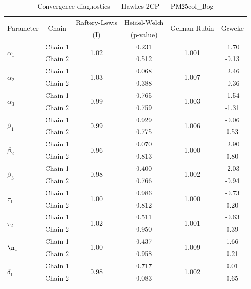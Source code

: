 \begin{table}[H]
\centering
\caption{Convergence diagnostics — Hawkes 2CP — PM25col_Bog}
\begin{tabular}{lccccc}
\toprule
\multirow{2}{*}{Parameter} & \multirow{2}{*}{Chain} & Raftery-Lewis & Heidel-Welch & \multirow{2}{*}{Gelman-Rubin} & \multirow{2}{*}{Geweke} \\
 & & (I) & (p-value) & & (z) \\
\midrule
\multirow{2}{*}{$\alpha_1$} & Chain 1 & \multirow{2}{*}{1.02} & 0.231 & \multirow{2}{*}{1.001} & -1.70 \\
 & Chain 2 & & 0.512 & & -0.13 \\
\multirow{2}{*}{$\alpha_2$} & Chain 1 & \multirow{2}{*}{1.03} & 0.068 & \multirow{2}{*}{1.007} & -2.46 \\
 & Chain 2 & & 0.388 & & -0.36 \\
\multirow{2}{*}{$\alpha_3$} & Chain 1 & \multirow{2}{*}{0.99} & 0.765 & \multirow{2}{*}{1.003} & -1.54 \\
 & Chain 2 & & 0.759 & & -1.31 \\
\midrule
\multirow{2}{*}{$\beta_1$} & Chain 1 & \multirow{2}{*}{0.99} & 0.929 & \multirow{2}{*}{1.006} & -0.06 \\
 & Chain 2 & & 0.775 & & 0.53 \\
\multirow{2}{*}{$\beta_2$} & Chain 1 & \multirow{2}{*}{0.96} & 0.070 & \multirow{2}{*}{1.000} & -2.90 \\
 & Chain 2 & & 0.813 & & 0.80 \\
\multirow{2}{*}{$\beta_3$} & Chain 1 & \multirow{2}{*}{0.98} & 0.400 & \multirow{2}{*}{1.002} & -2.03 \\
 & Chain 2 & & 0.766 & & -0.94 \\
\midrule
\multirow{2}{*}{$\tau_1$} & Chain 1 & \multirow{2}{*}{1.00} & 0.986 & \multirow{2}{*}{1.000} & -0.73 \\
 & Chain 2 & & 0.812 & & 0.20 \\
\multirow{2}{*}{$\tau_2$} & Chain 1 & \multirow{2}{*}{1.02} & 0.511 & \multirow{2}{*}{1.001} & -0.63 \\
 & Chain 2 & & 0.950 & & 0.39 \\
\midrule
\multirow{2}{*}{$\n_1$} & Chain 1 & \multirow{2}{*}{1.00} & 0.437 & \multirow{2}{*}{1.009} & 1.66 \\
 & Chain 2 & & 0.958 & & 0.21 \\
\midrule
\multirow{2}{*}{$\delta_1$} & Chain 1 & \multirow{2}{*}{0.98} & 0.717 & \multirow{2}{*}{1.002} & 0.01 \\
 & Chain 2 & & 0.083 & & 0.65 \\
\bottomrule
\end{tabular}
\end{table}

